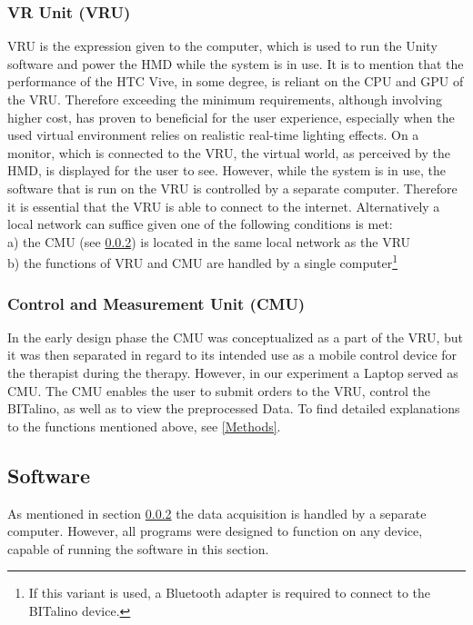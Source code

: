 \subsubsection{VR Unit (VRU)}
VRU is the expression given to the computer, which is used to run the Unity software and power the HMD while the system is in use. It is to mention that the performance of the HTC Vive, in some degree, is reliant on the CPU and GPU of the VRU. Therefore exceeding the minimum requirements, although involving higher cost, has proven to beneficial for the user experience, especially when the used virtual environment relies on realistic real-time lighting effects. On a monitor, which is connected to the VRU, the virtual world, as perceived by the HMD, is displayed for the user to see. However, while the system is in use, the software that is run on the VRU is controlled by a separate computer. Therefore it is essential that the VRU is able to connect to the internet. Alternatively a local network can suffice given one of the following conditions is met:\\[10pt]
a) the CMU (see \ref{CMU}) is located in the same local network as the VRU\\
b) the functions of VRU and CMU are handled by a single computer\footnote{If this variant is used, a Bluetooth adapter is required to connect to the BITalino device.}\\[10pt]
 
\subsubsection{Control and Measurement Unit (CMU)}\label{CMU}
In the early design phase the CMU was conceptualized as a part of the VRU, but it was then separated in regard to its intended use as a mobile control device for the therapist during the therapy. However, in our experiment a Laptop served as CMU. The CMU enables the user to submit orders to the VRU, control the BITalino, as well as to view the preprocessed Data. To find detailed explanations to the functions mentioned above, see \ref{Methods}.

\subsection{Software}
As mentioned in section \ref{CMU} the data acquisition is handled by a separate computer. However, all programs were designed to function on any device, capable of running the software in this section. 


